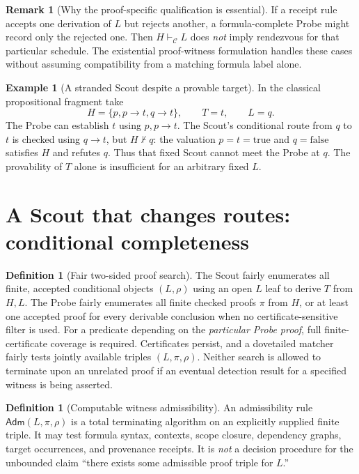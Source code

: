 \documentclass[11pt,letterpaper]{article}
\theoremstyle{definition}
\newtheorem{definition}[theorem]{Definition}
\newtheorem{example}[theorem]{Example}
\newtheorem{remark}[theorem]{Remark}
\newcommand{\vdC}{\vdash_{\mathcal C}}
\newcommand{\Adm}{\mathsf{Adm}}
\begin{document}
\begin{remark}[Why the proof-specific qualification is essential]
If a receipt rule accepts one derivation of $L$ but rejects another,
a formula-complete Probe might record only the rejected one. Then
$H\vdC L$ does \emph{not} imply rendezvous for that particular schedule.
The existential proof-witness formulation handles these cases without
assuming compatibility from a matching formula label alone.
\end{remark}

\begin{example}[A stranded Scout despite a provable target]\label{ex:stranded}
In the classical propositional fragment take
\[
 H=\{p,p\to t,q\to t\},\qquad T=t,\qquad L=q.
\]
The Probe can establish $t$ using $p,p\to t$. The Scout's conditional
route from $q$ to $t$ is checked using $q\to t$, but $H\nvdash q$:
the valuation $p=t=\mathrm{true}$ and $q=\mathrm{false}$ satisfies $H$
and refutes $q$. Thus that fixed Scout cannot meet the Probe at $q$.
The provability of $T$ alone is insufficient for an arbitrary fixed $L$.
\end{example}

\section{A Scout that changes routes: conditional completeness}
\begin{definition}[Fair two-sided proof search]
The Scout fairly enumerates all finite, accepted conditional objects
$(L,\rho)$ using an open $L$ leaf to derive $T$ from $H,L$. The Probe
fairly enumerates all finite checked proofs $\pi$ from $H$, or at least
one accepted proof for every derivable conclusion when no certificate-sensitive
filter is used. For a predicate depending on the \emph{particular Probe proof},
full finite-certificate coverage is required. Certificates persist, and
a dovetailed matcher fairly tests jointly available triples $(L,\pi,\rho)$.
Neither search is allowed to terminate upon an unrelated proof if an
eventual detection result for a specified witness is being asserted.
\end{definition}

\begin{definition}[Computable witness admissibility]
An admissibility rule $\Adm(L,\pi,\rho)$ is a total terminating algorithm
on an explicitly supplied finite triple. It may test formula syntax,
contexts, scope closure, dependency graphs, target occurrences, and
provenance receipts. It is \emph{not} a decision procedure for the
unbounded claim ``there exists some admissible proof triple for $L$.''
\end{definition}
\end{document}
